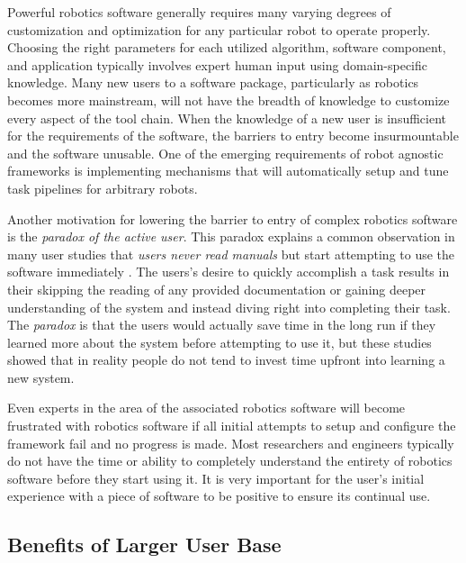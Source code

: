 \documentclass[10pt,journal,compsoc]{joser1}
\begin{document}
{Powerful robotics software generally requires many varying degrees of customization and optimization for any particular robot to operate properly. Choosing the right parameters for each utilized algorithm, software component, and application typically involves expert human input using domain-specific knowledge. Many new users to a software package, particularly as robotics becomes more mainstream, will not have the breadth of knowledge to customize every aspect of the tool chain. When the knowledge of a new user is insufficient for the requirements of the software, the barriers to entry become insurmountable and the software unusable. One of the emerging requirements of robot agnostic frameworks is implementing mechanisms that will automatically setup and tune task pipelines for arbitrary robots.

Another motivation for lowering the barrier to entry of complex robotics software is the \textit{paradox of the active user}. This paradox explains a common observation in many user studies that \textit{users never read manuals} but start attempting to use the software immediately \cite{carroll1987interfacing}. The users's desire to quickly accomplish a task results in their skipping the reading of any provided documentation or gaining deeper understanding of the system and instead diving right into completing their task. The \textit{paradox} is that the users would actually save time in the long run if they learned more about the system before attempting to use it, but these studies showed that in reality people do not tend to invest time upfront into learning a new system.

Even experts in the area of the associated robotics software will become frustrated with robotics software if all initial attempts to setup and configure the framework fail and no progress is made. Most researchers and engineers typically do not have the time or ability to completely understand the entirety of robotics software before they start using it. It is very important for the user's initial experience with a piece of software to be positive to ensure its continual use.

\subsection{Benefits of Larger User Base}

}
\end{document}
